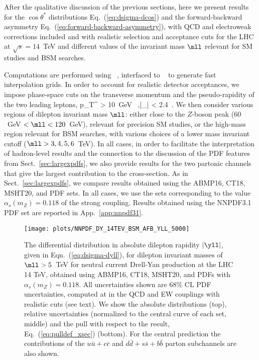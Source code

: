 
After the qualitative discussion of the previous sections, here we
present results for the $\cos\theta^*$
distributions Eq.~(\ref{eq:dsigma-dcos}) and the
forward-backward asymmetry Eq.~(\ref{eq:forward-backward-asymmetry}), with
\nlo QCD and electroweak corrections included and
with realistic selection and acceptance cuts for the LHC at $\sqrt{s} = 14$~TeV
and different values of the invariant mass $\mll$ relevant for SM
studies and BSM searches.

Computations are performed using \mgamc~\cite{Alwall:2014hca},
interfaced to \pineappl~\cite{Carrazza:2020gss,christopher_schwan_2022_7023438} to generate
fast interpolation grids.
%
In order to account for realistic detector acceptances,
we impose phase-space cuts on the transverse momentum and the pseudo-rapidity of the two
leading leptons,
\be
p_T^{\ell} > 10~{\rm GeV}  \, ,\qquad |\eta_{\ell}| < 2.4 \,.
\ee
We then consider various regions of dilepton invariant mass $\mll$:
either close to the $Z$-boson peak ($60$~GeV $< \mll < 120$~GeV),
relevant for precision SM studies, or the
high-mass region relevant for BSM searches, with  various choices of a
lower mass invariant cutoff ($\mll > 3,4,5,6$~TeV).
%
In all cases, in order to facilitate the interpretation of
hadron-level results  and the connection to
the discussion of the PDF features from Sect.~\ref{sec:largexpdfs},
we also provide results for the two partonic channels that give the
largest contribution to the cross-section.
%
As in Sect.~\ref{sec:largexpdfs}, we compare results obtained using
the  ABMP16, CT18, MSHT20, and  PDF sets.
%
In all cases, we
use the  \nnlo sets corresponding to the value $\alpha_s(m_Z)=0.118$
of the strong coupling.
%
Results obtained using the NNPDF3.1 PDF set are reported in App.~\ref{app:nnpdf31}.

\begin{figure}[!t]
 \centering
 \texttt{[image: plots/NNPDF\_DY\_14TEV\_BSM\_AFB\_YLL\_5000]}
 \caption{The differential distribution in absolute dilepton rapidity $|\yll|$, given in
Eqn.~(\ref{eq:dsigma-dyll}),
for dilepton invariant masses of $\mll > 5$~TeV
for neutral current Drell-Yan production at the
LHC 14 TeV,
obtained using ABMP16, CT18, MSHT20, and  \nnlo PDFs with $\alpha_s(m_Z)=0.118$.
%
All
uncertainties shown are 68\% CL PDF uncertainties, computed at \nlo
in the QCD and EW couplings with realistic cuts (see text).
We show the absolute distributions (top), relative uncertainties (normalized
to the central curve of each set, middle) and the pull with respect to the
 result, Eq.~(\ref{eq:pulldef_xsec}) (bottom).
%
For the central  prediction
the contributions of the $u\bar{u}+c\bar{c}$ and $d\bar{d}+s\bar{s}+b\bar{b}$
parton subchannels are also shown.
 \label{fig:CMS_DY_14TEV_MLL_5000_rap}}
\end{figure}

